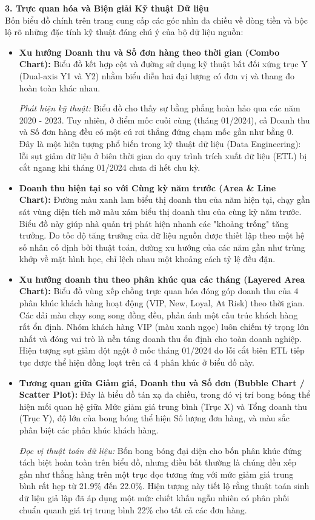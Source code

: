 \textbf{3. Trực quan hóa và Biện giải Kỹ thuật Dữ liệu} \\
Bốn biểu đồ chính trên trang cung cấp các góc nhìn đa chiều về dòng tiền và bộc lộ rõ những đặc tính kỹ thuật đáng chú ý của bộ dữ liệu nguồn:
\begin{itemize}
    \item \textbf{Xu hướng Doanh thu và Số đơn hàng theo thời gian (Combo Chart):} 
    Biểu đồ kết hợp cột và đường sử dụng kỹ thuật bất đối xứng trục Y (Dual-axis Y1 và Y2) nhằm biểu diễn hai đại lượng có đơn vị và thang đo hoàn toàn khác nhau. 
    
    \textit{Phát hiện kỹ thuật:} Biểu đồ cho thấy sự bằng phẳng hoàn hảo qua các năm 2020 - 2023. Tuy nhiên, ở điểm mốc cuối cùng (tháng 01/2024), cả Doanh thu và Số đơn hàng đều có một cú rơi thẳng đứng chạm mốc gần như bằng 0. Đây là một hiện tượng phổ biến trong kỹ thuật dữ liệu (Data Engineering): lỗi sụt giảm dữ liệu ở biên thời gian do quy trình trích xuất dữ liệu (ETL) bị cắt ngang khi tháng 01/2024 chưa đi hết chu kỳ.
    
    \item \textbf{Doanh thu hiện tại so với Cùng kỳ năm trước (Area \& Line Chart):} 
    Đường màu xanh lam biểu thị doanh thu của năm hiện tại, chạy gần sát vùng diện tích mờ màu xám biểu thị doanh thu của cùng kỳ năm trước. Biểu đồ này giúp nhà quản trị phát hiện nhanh các "khoảng trống" tăng trưởng. Do tốc độ tăng trưởng của dữ liệu nguồn được thiết lập theo một hệ số nhân cố định bởi thuật toán, đường xu hướng của các năm gần như trùng khớp về mặt hình học, chỉ lệch nhau một khoảng cách tỷ lệ đều đặn.
    
    \item \textbf{Xu hướng doanh thu theo phân khúc qua các tháng (Layered Area Chart):} 
    Biểu đồ vùng xếp chồng trực quan hóa đóng góp doanh thu của 4 phân khúc khách hàng hoạt động (VIP, New, Loyal, At Risk) theo thời gian. Các dải màu chạy song song đồng đều, phản ánh một cấu trúc khách hàng rất ổn định. Nhóm khách hàng VIP (màu xanh ngọc) luôn chiếm tỷ trọng lớn nhất và đóng vai trò là nền tảng doanh thu ổn định cho toàn doanh nghiệp. Hiện tượng sụt giảm đột ngột ở mốc tháng 01/2024 do lỗi cắt biên ETL tiếp tục được thể hiện đồng loạt trên cả 4 phân khúc ở biểu đồ này.
    
    \item \textbf{Tương quan giữa Giảm giá, Doanh thu và Số đơn (Bubble Chart / Scatter Plot):} 
    Đây là biểu đồ tán xạ đa chiều, trong đó vị trí bong bóng thể hiện mối quan hệ giữa Mức giảm giá trung bình (Trục X) và Tổng doanh thu (Trục Y), độ lớn của bong bóng thể hiện Số lượng đơn hàng, và màu sắc phân biệt các phân khúc khách hàng.
    
    \textit{Đọc vị thuật toán dữ liệu:} Bốn bong bóng đại diện cho bốn phân khúc đứng tách biệt hoàn toàn trên biểu đồ, nhưng điều bất thường là chúng đều xếp gần như thẳng hàng trên một trục dọc tương ứng với mức giảm giá trung bình rất hẹp từ 21.9\% đến 22.0\%. Hiện tượng này tiết lộ rằng thuật toán sinh dữ liệu giả lập đã áp dụng một mức chiết khấu ngẫu nhiên có phân phối chuẩn quanh giá trị trung bình 22\% cho tất cả các đơn hàng.
\end{itemize}

